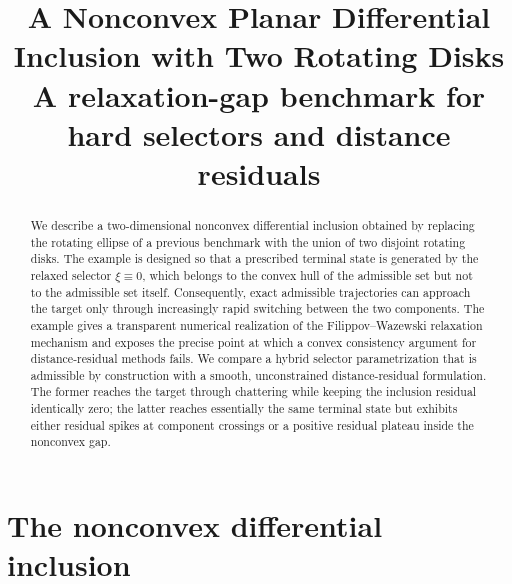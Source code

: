 \documentclass[11pt]{article}
\title{A Nonconvex Planar Differential Inclusion with Two Rotating Disks\\
\large A relaxation-gap benchmark for hard selectors and distance residuals}
\author{}
\date{}
\begin{document}
\maketitle

\begin{abstract}
We describe a two-dimensional nonconvex differential inclusion obtained by replacing the rotating ellipse of a previous benchmark with the union of two disjoint rotating disks. The example is designed so that a prescribed terminal state is generated by the relaxed selector $\xi\equiv 0$, which belongs to the convex hull of the admissible set but not to the admissible set itself. Consequently, exact admissible trajectories can approach the target only through increasingly rapid switching between the two components. The example gives a transparent numerical realization of the Filippov--Wazewski relaxation mechanism and exposes the precise point at which a convex consistency argument for distance-residual methods fails. We compare a hybrid selector parametrization that is admissible by construction with a smooth, unconstrained distance-residual formulation. The former reaches the target through chattering while keeping the inclusion residual identically zero; the latter reaches essentially the same terminal state but exhibits either residual spikes at component crossings or a positive residual plateau inside the nonconvex gap.
\end{abstract}

\section{The nonconvex differential inclusion}
\end{document}
